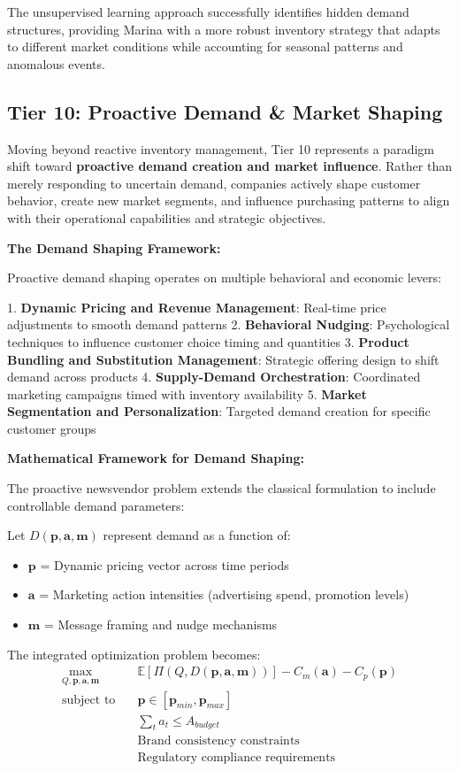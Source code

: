 \documentclass{article}
\begin{document}
The unsupervised learning approach successfully identifies hidden demand structures, providing Marina with a more robust inventory strategy that adapts to different market conditions while accounting for seasonal patterns and anomalous events.

\subsection{Tier 10: Proactive Demand \& Market Shaping}

Moving beyond reactive inventory management, Tier 10 represents a paradigm shift toward \textbf{proactive demand creation and market influence}. Rather than merely responding to uncertain demand, companies actively shape customer behavior, create new market segments, and influence purchasing patterns to align with their operational capabilities and strategic objectives.

\textbf{The Demand Shaping Framework:}

Proactive demand shaping operates on multiple behavioral and economic levers:

1. \textbf{Dynamic Pricing and Revenue Management}: Real-time price adjustments to smooth demand patterns
2. \textbf{Behavioral Nudging}: Psychological techniques to influence customer choice timing and quantities  
3. \textbf{Product Bundling and Substitution Management}: Strategic offering design to shift demand across products
4. \textbf{Supply-Demand Orchestration}: Coordinated marketing campaigns timed with inventory availability
5. \textbf{Market Segmentation and Personalization}: Targeted demand creation for specific customer groups

\textbf{Mathematical Framework for Demand Shaping:}

The proactive newsvendor problem extends the classical formulation to include controllable demand parameters:

Let $D(\mathbf{p}, \mathbf{a}, \mathbf{m})$ represent demand as a function of:
\begin{itemize}
\item $\mathbf{p}$ = Dynamic pricing vector across time periods
\item $\mathbf{a}$ = Marketing action intensities (advertising spend, promotion levels)
\item $\mathbf{m}$ = Message framing and nudge mechanisms
\end{itemize}

The integrated optimization problem becomes:
\begin{align}
\max_{Q, \mathbf{p}, \mathbf{a}, \mathbf{m}} \quad &\mathbb{E}[\Pi(Q, D(\mathbf{p}, \mathbf{a}, \mathbf{m}))] - C_m(\mathbf{a}) - C_p(\mathbf{p})\\
\text{subject to} \quad &\mathbf{p} \in [\mathbf{p}_{min}, \mathbf{p}_{max}]\\
&\sum_t a_t \leq A_{budget}\\
&\text{Brand consistency constraints}\\
&\text{Regulatory compliance requirements}
\end{align}
\end{document}
